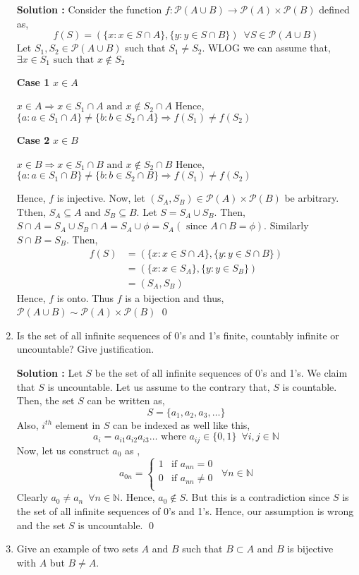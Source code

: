 \documentclass[10pt]{article}
\newcommand{\nn}{\mathbb{N}}
\newcommand{\p}{\mathcal{P}}
\begin{document}
\begin{enumerate}
	    \textbf{Solution : }Consider the function $f : \p(A \cup B) \to \p(A) \times \p(B)$ defined as,
	    $$f(S) = (\{ x : x \in S \cap A \},\{ y : y \in S \cap B \}) \,\,\, \forall S \in \p(A \cup B)$$
	    Let $S_1, S_2 \in \p(A \cup B)$ such that $S_1 \neq S_2$. WLOG we can assume that, $\exists x \in S_1 \text{ such that } x \notin S_2$

	    \textbf{Case 1 }$x \in A$ 

    $x \in A \Rightarrow x \in S_1 \cap A \text{ and } x \notin S_2 \cap A$
    Hence, $\{a : a \in S_1 \cap A \} \neq \{ b : b \in S_2 \cap A \} \Rightarrow f(S_1) \neq f(S_2)$

	    \textbf{Case 2 }$x \in B$ 

    $x \in B \Rightarrow x \in S_1 \cap B \text{ and } x \notin S_2 \cap B$
    Hence, $\{a : a \in S_1 \cap B \} \neq \{ b : b \in S_2 \cap B \} \Rightarrow f(S_1) \neq f(S_2)$

    Hence, $f$ is injective. Now, let $(S_A, S_B) \in \p(A) \times \p(B)$ be arbitrary. Tthen, $S_A \subseteq A$ and $S_B \subseteq B$.
    Let $S = S_A \cup S_B$. Then, $S \cap A = S_A \cup S_B \cap A = S_A \cup \phi = S_A (\text{ since } A \cap B = \phi)$. Similarly $S \cap B = S_B$.
    Then, 
    \begin{align*}
	f(S) &= (\{ x : x \in S \cap A \}, \{ y : y \in S \cap B \}) \\
     	&= (\{x : x \in S_A\}, \{y : y \in S_B\})\\
	&=(S_A, S_B)
    \end{align*}
    Hence, $f$ is onto. Thus $f$ is a bijection and thus, $\p(A \cup B) \sim \p(A) \times \p(B)$ \qed

    \item Is the set of all infinite sequences of 0's and 1's finite, countably infinite or uncountable? Give justification.

    \textbf{Solution : }Let $S$ be the set of all infinite sequences of 0's and 1's. We claim that $S$ is uncountable. Let us assume to the contrary that, $S$ is countable. Then, the set $S$ can be written as, $$S = \{ a_1, a_2, a_3, \dots \}$$ Also, $i^{th}$ element in $S$ can be indexed as well like this, $$a_i = a_{i1} a_{i2} a_{i3} \dots \text{ where } a_{ij} \in \{0, 1\} \,\,\, \forall i,j \in \nn$$ 
    Now, let us construct $a_0$ as ,
    \begin{equation*}
        a_{0n} = 
        \begin{cases}
            1 & \text{if }a_{nn} = 0 \\
            0 & \text{if }a_{nn} \neq 0\\
        \end{cases}
        \,\,\, \forall n \in \nn
    \end{equation*}
    Clearly $a_0 \neq a_n \,\,\, \forall n \in \nn$. Hence, $a_0 \notin S$. But this is a contradiction since $S$ is the set of all infinite sequences of 0's and 1's. Hence, our assumption is wrong and the set $S$ is uncountable. \qed
    \item Give an example of two sets $A$ and $B$ such that $B \subset A$ and $B$ is bijective with $A$ but $B \neq A$.


\end{enumerate}
\end{document}

